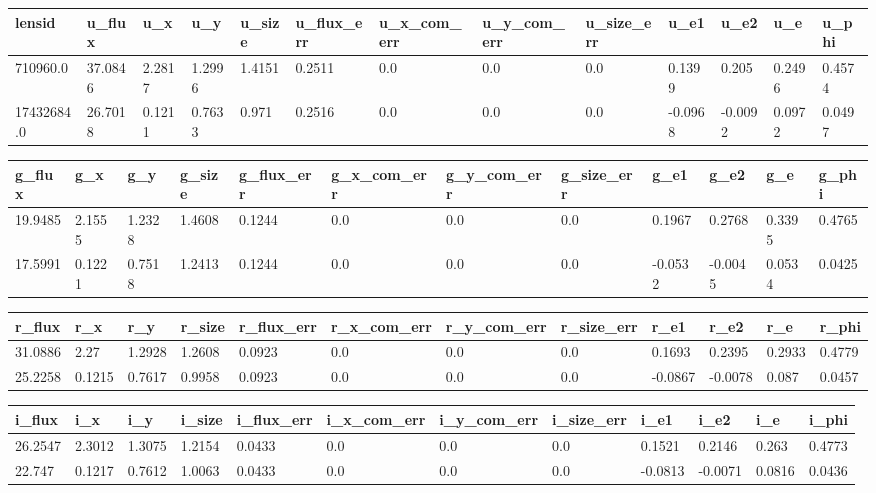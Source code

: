 \documentclass[\docopts]{\docclass}
\begin{document}
\begin{table}[!h]
\label{table:object_table}
\centering

\begin{tabular}{|l|l|l|l|l|l|l|l|l|l|l|l|l|}
\hline
lensid     & u\_flux & u\_x   & u\_y   & u\_size & u\_flux\_err & u\_x\_com\_err & u\_y\_com\_err & u\_size\_err & u\_e1   & u\_e2   & u\_e   & u\_phi \\ \hline
710960.0   & 37.0846 & 2.2817 & 1.2996 & 1.4151  & 0.2511       & 0.0            & 0.0            & 0.0          & 0.1399  & 0.205   & 0.2496 & 0.4574 \\ \hline
17432684.0 & 26.7018 & 0.1211 & 0.7633 & 0.971   & 0.2516       & 0.0            & 0.0            & 0.0          & -0.0968 & -0.0092 & 0.0972 & 0.0497 \\ \hline
\end{tabular}

\begin{tabular}{|l|l|l|l|l|l|l|l|l|l|ll|}
\hline
g\_flux & g\_x   & g\_y   & g\_size & g\_flux\_err & g\_x\_com\_err & g\_y\_com\_err & g\_size\_err & g\_e1   & g\_e2   & g\_e   & g\_phi	\\ \hline
19.9485 & 2.1555 & 1.2328 & 1.4608  & 0.1244       & 0.0            & 0.0            & 0.0          & 0.1967  & 0.2768  & 0.3395 & 0.4765 \\ \hline
17.5991 & 0.1221 & 0.7518 & 1.2413  & 0.1244       & 0.0            & 0.0            & 0.0          & -0.0532 & -0.0045 & 0.0534	& 0.0425	\\ \hline
\end{tabular}


\begin{tabular}{|l|l|l|l|l|l|l|l|l|l|l|l|}
\hline
r\_flux & r\_x   & r\_y   & r\_size & r\_flux\_err & r\_x\_com\_err & r\_y\_com\_err & r\_size\_err & r\_e1   & r\_e2   & r\_e   & r\_phi \\ \hline
31.0886 & 2.27   & 1.2928 & 1.2608  & 0.0923       & 0.0            & 0.0            & 0.0          & 0.1693  & 0.2395  & 0.2933 & 0.4779 \\
25.2258 & 0.1215 & 0.7617 & 0.9958  & 0.0923       & 0.0            & 0.0            & 0.0          & -0.0867 & -0.0078 & 0.087  & 0.0457 \\ \hline
\end{tabular}

\begin{tabular}{|l|l|l|l|l|l|l|l|l|l|l|l|}
\hline
i\_flux & i\_x   & i\_y   & i\_size & i\_flux\_err & i\_x\_com\_err & i\_y\_com\_err & i\_size\_err & i\_e1   & i\_e2   & i\_e   & i\_phi \\ \hline
26.2547 & 2.3012 & 1.3075 & 1.2154  & 0.0433       & 0.0            & 0.0            & 0.0          & 0.1521  & 0.2146  & 0.263  & 0.4773 \\
22.747  & 0.1217 & 0.7612 & 1.0063  & 0.0433       & 0.0            & 0.0            & 0.0          & -0.0813 & -0.0071 & 0.0816 & 0.0436 \\ \hline
\end{tabular}


\end{table}
\end{document}
